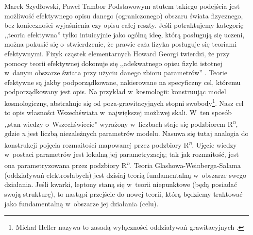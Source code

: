 \begin{artplenv2auth}{Marek Szydłowski, Paweł Tambor}
Podstawowym atutem takiego podejścia jest możliwość efektywnego opisu danego (ograniczonego) obszaru świata fizycznego, bez konieczności wyjaśnienia czy opisu całej reszty. Jeśli potraktujemy kategorię ,,teoria efektywna'' tylko intuicyjnie jako ogólną ideę, którą posługują się uczeni, można pokusić się o~stwierdzenie, że prawie cała fizyka posługuje się teoriami efektywnymi. Fizyk cząstek elementarnych Howard Georgi twierdzi, że przy pomocy teorii efektywnej dokonuje się ,,adekwatnego opisu fizyki istotnej w~danym obszarze świata przy użyciu danego zbioru parametrów''
\parencite[][]{georgi_effective_1993}. %
 Teorie efektywne są jakby podporządkowane, nakierowane na specyficzny cel, któremu podporządkowany jest opis. Na przykład w~kosmologii: konstruując model kosmologiczny, abstrahuje się od poza-grawitacyjnych stopni swobody\footnote{Michał Heller nazywa to zasadą wyłączności oddziaływań grawitacyjnych 
\parencite[][s.~60]{heller_ewolucyjny_1969}.%
}. Nasz cel to opis własności Wszechświata w~największej możliwej skali. W~ten sposób ,,stan wiedzy o~Wszechświecie'' wyrażony w~liczbach staje się podzbiorem R\textsuperscript{\textit{n}}, gdzie \textit{n} jest liczbą niezależnych parametrów modelu. Nasuwa się tutaj analogia do konstrukcji pojęcia rozmaitości mapowanej przez podzbiory R\textsuperscript{\textit{n}}. Ujęcie wiedzy w~postaci parametrów jest lokalną jej parametryzacją; tak jak rozmaitość, jest ona parametryzowana przez podzbiory R\textsuperscript{\textit{n}}. Teoria Glashowa-Weinberga-Salama (oddziaływań elektrosłabych) jest dzisiaj teorią fundamentalną w~obszarze swego działania. Jeśli kwarki, leptony staną się w~teorii niepunktowe (będą posiadać swoją strukturę), to nastąpi przejście do nowej teorii, którą będziemy traktować jako fundamentalną w~obszarze jej działania (celu).


\end{artplenv2auth}
